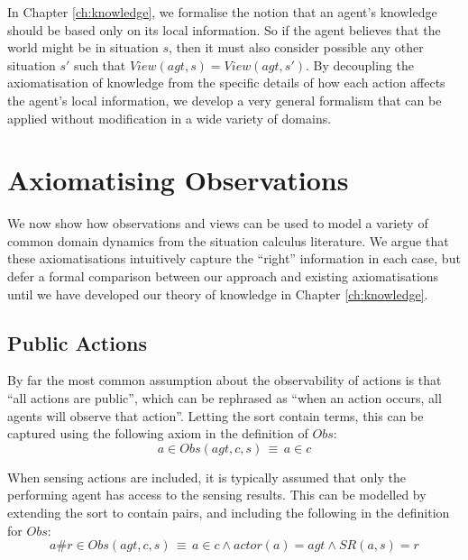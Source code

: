 In Chapter \ref{ch:knowledge}, we formalise the notion that an agent's
knowledge should be based only on its local information. So if the
agent believes that the world might be in situation $s$, then it
must also consider possible any other situation $s'$ such that $View(agt,s)=View(agt,s')$.
By decoupling the axiomatisation of knowledge from the specific details
of how each action affects the agent's local information, we develop
a very general formalism that can be applied without modification
in a wide variety of domains.


\section{Axiomatising Observations\label{sec:Observations:Axiomatising-simple}}

We now show how observations and views can be used to model a variety
of common domain dynamics from the situation calculus literature.
We argue that these axiomatisations intuitively capture the {}``right''
information in each case, but defer a formal comparison between our
approach and existing axiomatisations until we have developed our
theory of knowledge in Chapter \ref{ch:knowledge}.


\subsection{Public Actions}

By far the most common assumption about the observability of actions
is that {}``all actions are public'', which can be rephrased as
{}``when an action occurs, all agents will observe that action''.
Letting the sort contain terms, this
can be captured using the following axiom in the definition of $Obs$:\begin{equation}
a\in Obs(agt,c,s)\,\equiv\, a\in c\label{eq:Observations:ObsStd1}\end{equation}


When sensing actions are included, it is typically assumed that only
the performing agent has access to the sensing results. This can be
modelled by extending the  sort to contain 
pairs, and including the following in the definition for $Obs$:\begin{equation}
a\#r\in Obs(agt,c,s)\,\equiv\, a\in c\wedge actor(a)=agt\wedge SR(a,s)=r\label{eq:Observations:ObsStd2}\end{equation}


